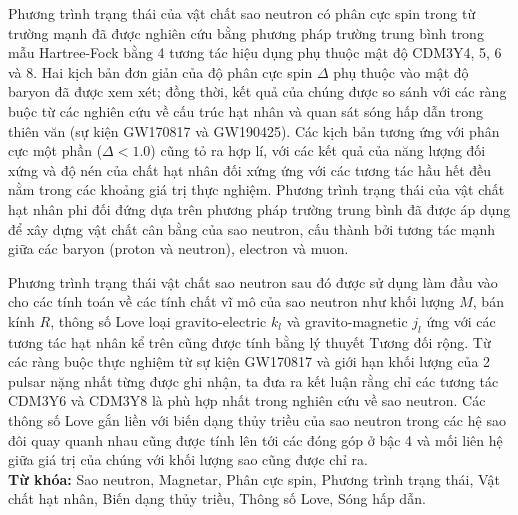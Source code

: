Phương trình trạng thái của vật chất sao neutron có phân cực spin trong từ trường mạnh đã
được nghiên cứu bằng phương pháp trường trung bình trong mẫu Hartree-Fock bằng 4 tương tác
hiệu dụng phụ thuộc mật độ CDM3Y4, 5, 6 và 8. Hai kịch bản đơn giản của độ phân cực spin
$\Delta$ phụ thuộc vào mật độ baryon đã được xem xét; đồng thời, kết quả của chúng được so
sánh với các ràng buộc từ các nghiên cứu về cấu trúc hạt nhân và quan sát sóng hấp dẫn
trong thiên văn (sự kiện GW170817 và GW190425). Các kịch bản tương ứng với phân cực một
phần ($\Delta < 1.0$) cũng tỏ ra hợp lí, với các kết quả của năng lượng đối xứng và độ nén
của chất hạt nhân đối xứng ứng với các tương tác hầu hết đều nằm trong các khoảng giá trị
thực nghiệm. Phương trình trạng thái của vật chất hạt nhân phi đối đứng dựa trên phương
pháp trường trung bình đã được áp dụng để xây dựng vật chất cân bằng \textbeta của sao
neutron, cấu thành bởi tương tác mạnh giữa các baryon (proton và neutron), electron và muon.

Phương trình trạng thái vật chất sao neutron sau đó được sử dụng làm đầu vào cho các tính
toán về các tính chất vĩ mô của sao neutron như khối lượng $M$, bán kính $R$, thông số
Love loại gravito-electric $k_l$ và gravito-magnetic $j_l$ ứng với các tương tác hạt nhân
kể trên cũng được tính bằng lý thuyết Tương đối rộng. Từ các ràng buộc thực nghiệm từ sự kiện GW170817 và giới hạn khối lượng của 2 pulsar nặng nhất từng được ghi nhận, ta đưa ra kết luận rằng chỉ các tương tác CDM3Y6 và CDM3Y8 là phù hợp nhất trong nghiên cứu về sao neutron. Các thông số Love gắn liền với biến dạng thủy triều của sao neutron trong các hệ sao đôi quay quanh nhau cũng được tính lên tới các đóng góp ở bậc 4 và mối liên hệ giữa giá trị của chúng với khối lượng sao cũng được chỉ ra.\\[5mm]
\textbf{Từ khóa:} Sao neutron, Magnetar, Phân cực spin, Phương trình trạng thái, Vật chất hạt nhân, Biến dạng thủy triều, Thông số Love, Sóng hấp dẫn.
